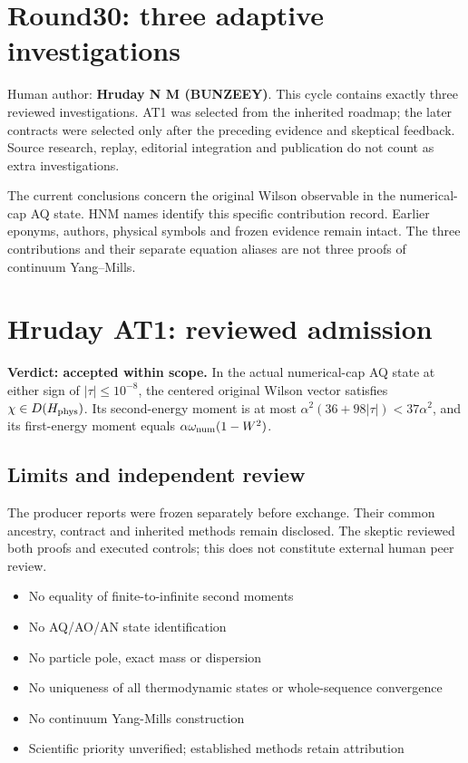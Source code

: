 \section{Round30: three adaptive investigations}

\label{sec:round30-overview}

Human author: \textbf{Hruday N M (BUNZEEY)}. This cycle contains exactly three reviewed investigations. AT1 was selected from the inherited roadmap; the later contracts were selected only after the preceding evidence and skeptical feedback. Source research, replay, editorial integration and publication do not count as extra investigations.

The current conclusions concern the original Wilson observable in the numerical-cap AQ state. HNM names identify this specific contribution record. Earlier eponyms, authors, physical symbols and frozen evidence remain intact. The three contributions and their separate equation aliases are not three proofs of continuum Yang--Mills.



\clearpage\section{Hruday AT1: reviewed admission}

\label{stmt:AT1}

\textbf{Verdict: accepted within scope.} In the actual numerical-cap AQ state at either sign of $|\tau|\le10^{-8}$, the centered original Wilson vector satisfies $\chi\in D(H_{\rm phys})$. Its second-energy moment is at most $\alpha^2(36+98|\tau|)<37\alpha^2$, and its first-energy moment equals $\alpha\omega_{\rm num}(1-W^2)$.

\subsection*{Limits and independent review}

The producer reports were frozen separately before exchange. Their common ancestry, contract and inherited methods remain disclosed. The skeptic reviewed both proofs and executed controls; this does not constitute external human peer review.

\begin{itemize}

\item No equality of finite-to-infinite second moments

\item No AQ/AO/AN state identification

\item No particle pole, exact mass or dispersion

\item No uniqueness of all thermodynamic states or whole-sequence convergence

\item No continuum Yang-Mills construction

\item Scientific priority unverified; established methods retain attribution

\end{itemize}

